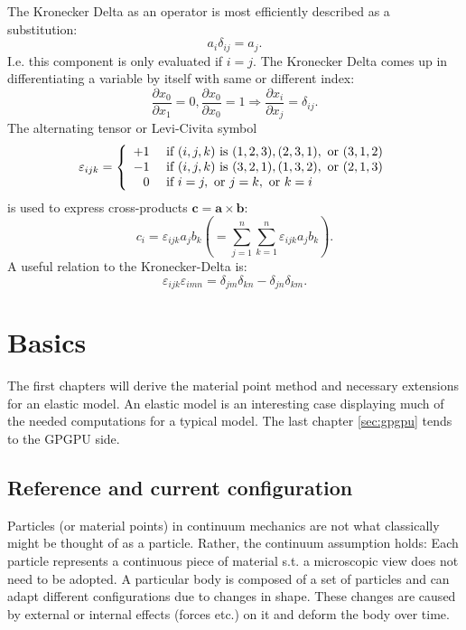 \documentclass[m,times]{cgMA}
\begin{document}
The Kronecker Delta as an operator is most efficiently described as a substitution:
\begin{equation}
  a _ { i } \delta _ { i j } = a _ { j }.
\end{equation}
I.e. this component is only evaluated if $i = j$. The Kronecker Delta comes up in differentiating a variable by itself with same or different index:
\begin{equation}
  \frac{\partial{x_0}}{\partial{x_1}}=0, \frac{\partial{x_0}}{\partial{x_0}}=1  \Rightarrow \frac{\partial{x_i}}{\partial{x_j}} = \delta_{ij}.
\end{equation}
The alternating tensor or Levi-Civita symbol
\begin{equation}
  \varepsilon _ { i j k } = \left\{ \begin{array} { r l } { + 1 } & { \text { if } ( i , j , k ) \text { is } ( 1,2,3 ) , ( 2,3,1 ) , \text { or } ( 3,1,2 ) } \\ { - 1 } & { \text { if } ( i , j , k ) \text { is } ( 3,2,1 ) , ( 1,3,2 ) , \text { or } ( 2,1,3 ) } \\ { 0 } & { \text { if } i = j , \text { or } j = k , \text { or } k = i } \end{array} \right.
\end{equation}
is used to express cross-products $\boldsymbol{c}=\boldsymbol{a} \times \boldsymbol{b}$:
\begin{equation}
  c_i = \varepsilon_{ijk} a_j b_k \left(= \sum _ { j = 1 } ^ { n } \sum _ { k = 1 } ^ { n } \varepsilon_{ijk} a_j b_k\right).
\end{equation}
A useful relation to the Kronecker-Delta is:
\begin{equation} \label{eq:compact_levi}
  \varepsilon _ { i j k } \varepsilon _ { i m n } = \delta _ { j m } \delta _ { k n } - \delta _ { j n } \delta _ { k m }.
\end{equation}
\begin{flushright}\cite{MCGINTY:CONTINUUM}\end{flushright}
\clearpage
\section{Basics}\label{sec:basics}
The first chapters will derive the material point method and necessary extensions for an elastic model. An elastic model is an interesting case displaying much of the needed computations for a typical model. The last chapter \ref{sec:gpgpu} tends to the GPGPU side.
\subsection{Reference and current configuration}\label{sec:ref_corr_config}
Particles (or material points) in continuum mechanics are not what classically might be thought of as a particle. Rather, the continuum assumption holds: Each particle represents a continuous piece of material s.t. a microscopic view does not need to be adopted. A particular body is composed of a set of particles and can adapt different configurations due to changes in shape. These changes are caused by external or internal effects (forces etc.) on it and deform the body over time. \cite{MIT:CONTINUUM_MECHANICS} \cite{MPM:COURSE}
\end{document}
